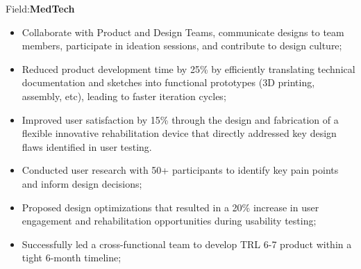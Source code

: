 {Field:\textbf{MedTech}
\newline{}
\begin{itemize}
\item Collaborate with Product and Design Teams, communicate designs to team members, participate in ideation sessions, and contribute to design culture;
\item Reduced product development time by 25\% by efficiently translating technical documentation and sketches into functional prototypes (3D printing, assembly, etc), leading to faster iteration cycles;
\item Improved user satisfaction by 15\% through the design and fabrication of a flexible innovative rehabilitation device that directly addressed key design flaws identified in user testing.
\item Conducted user research with 50+ participants to identify key pain points and inform design decisions;
\item Proposed design optimizations that resulted in a 20\% increase in user engagement and rehabilitation opportunities during usability testing;
\item Successfully led a cross-functional team to develop TRL 6-7 product within a tight 6-month timeline;
\end{itemize}
}

